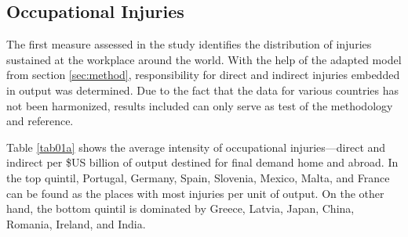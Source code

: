 \documentclass[a4paper,12pt, ]{article}
\begin{document}
\subsection{Occupational Injuries}

The first measure assessed in the study identifies the distribution of injuries sustained at the workplace around the world. With the help of the adapted model from section \ref{sec:method}, responsibility for direct and indirect injuries embedded in output was determined. Due to the fact that the data for various countries has not been harmonized, results included can only serve as test of the methodology and reference.

Table \ref{tab01a} shows the average intensity of occupational injuries---direct and indirect per \$US billion of output destined for final demand home and abroad. In the top quintil, Portugal, Germany, Spain, Slovenia, Mexico, Malta, and France can be found as the places with most injuries per unit of output. On the other hand, the bottom quintil is dominated by Greece, Latvia, Japan, China, Romania, Ireland, and India. 
\end{document}
